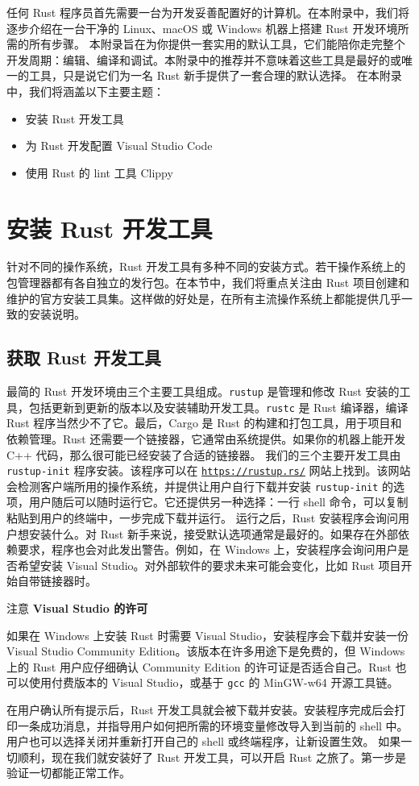 任何 Rust 程序员首先需要一台为开发妥善配置好的计算机。在本附录中，我们将逐步介绍在一台干净的 Linux、macOS 或 Windows 机器上搭建 Rust 开发环境所需的所有步骤。
本附录旨在为你提供一套实用的默认工具，它们能陪你走完整个开发周期：编辑、编译和调试。本附录中的推荐并不意味着这些工具是最好的或唯一的工具，只是说它们为一名 Rust 新手提供了一套合理的默认选择。
在本附录中，我们将涵盖以下主要主题：
\begin{itemize}
  \item 安装 Rust 开发工具
  \item 为 Rust 开发配置 Visual Studio Code
  \item 使用 Rust 的 lint 工具 Clippy
\end{itemize}
\section{安装 Rust 开发工具}
\label{idx:idx_d833e0da}
针对不同的操作系统，Rust 开发工具有多种不同的安装方式。若干操作系统上的包管理器都有各自独立的发行包。在本节中，我们将重点关注由 Rust 项目创建和维护的官方安装工具集。这样做的好处是，在所有主流操作系统上都能提供几乎一致的安装说明。
\subsection{获取 Rust 开发工具}
\label{idx:idx_75182d64}
最简的 Rust 开发环境由三个主要工具组成。\texttt{rustup} 是管理和修改 Rust 安装的工具，包括更新到更新的版本以及安装辅助开发工具。\texttt{rustc} 是 Rust 编译器，编译 Rust 程序当然少不了它。最后，Cargo 是 Rust 的构建和打包工具，用于项目和依赖管理。Rust 还需要一个链接器，它通常由系统提供。如果你的机器上能开发 C++ 代码，那么很可能已经安装了合适的链接器。
\label{idx:idx_bb26e788}
我们的三个主要开发工具由 \texttt{rustup-init} 程序安装。该程序可以在 \href{https://rustup.rs/}{\texttt{https:/\allowbreak{}/\allowbreak{}rustup.\allowbreak{}rs/\allowbreak{}}} 网站上找到。该网站会检测客户端所用的操作系统，并提供让用户自行下载并安装 \texttt{rustup-init} 的选项，用户随后可以随时运行它。它还提供另一种选择：一行 shell 命令，可以复制粘贴到用户的终端中，一步完成下载并运行。
运行之后，Rust 安装程序会询问用户想安装什么。对 Rust 新手来说，接受默认选项通常是最好的。如果存在外部依赖要求，程序也会对此发出警告。例如，在 Windows 上，安装程序会询问用户是否希望安装 Visual Studio。对外部软件的要求未来可能会变化，比如 Rust 项目开始自带链接器时。
\label{idx:idx_6467cb08}
\begin{myNotic}{注意}
\textbf{Visual Studio 的许可}

如果在 Windows 上安装 Rust 时需要 Visual Studio，安装程序会下载并安装一份 Visual Studio Community Edition。该版本在许多用途下是免费的，但 Windows 上的 Rust 用户应仔细确认 Community Edition 的许可证是否适合自己。Rust 也可以使用付费版本的 Visual Studio，或基于 \texttt{gcc} 的 MinGW-\allowbreak{}w64 开源工具链。
\end{myNotic}
\label{idx:idx_73915094}
在用户确认所有提示后，Rust 开发工具就会被下载并安装。安装程序完成后会打印一条成功消息，并指导用户如何把所需的环境变量修改导入到当前的 shell 中。用户也可以选择关闭并重新打开自己的 shell 或终端程序，让新设置生效。
如果一切顺利，现在我们就安装好了 Rust 开发工具，可以开启 Rust 之旅了。第一步是验证一切都能正常工作。
